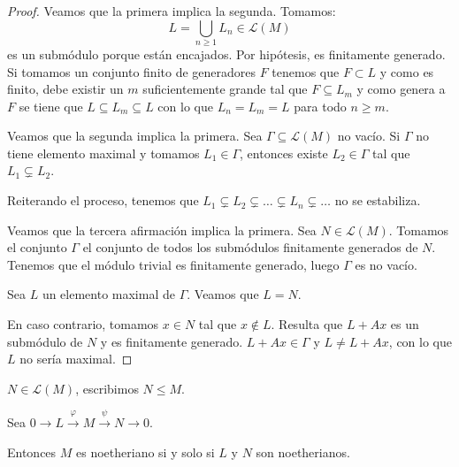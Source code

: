 \begin{proof}
  Veamos que la primera implica la segunda.
  Tomamos:
  \[
    L=\bigcup_{n\ge 1} L_n\in\mathcal{L}(M)
  \]
  es un submódulo porque están encajados. Por hipótesis, es finitamente
  generado. Si tomamos un conjunto finito de generadores \(F\)
  tenemos que \(F\subset L\) y como es finito, debe existir un \(m\)
  suficientemente grande tal que \(F\subseteq L_m\) y como
  genera a \(F\) se tiene que \(L\subseteq L_m\subseteq L\)
  con lo que \(L_n=L_m=L\) para todo \(n\ge m\).

  Veamos que la segunda implica la primera. Sea \(\Gamma\subseteq
  \mathcal{L}(M)\) no vacío. Si \(\Gamma\) no tiene elemento maximal
  y tomamos \(L_1\in\Gamma\), entonces existe \(L_2\in\Gamma\)
  tal que \(L_1\subsetneq L_2\).

  Reiterando el proceso, tenemos que \(L_1\subsetneq L_2\subsetneq
  \ldots\subsetneq L_n\subsetneq\ldots\) no se estabiliza.

  Veamos que la tercera afirmación implica la primera.
  Sea \(N\in\mathcal{L}(M)\).
  Tomamos el conjunto \(\Gamma\) el conjunto de todos los submódulos
  finitamente generados de \(N\). Tenemos que el módulo trivial
  es finitamente generado, luego \(\Gamma\) es no vacío.

  Sea \(L\) un elemento maximal de \(\Gamma\). Veamos que \(L=N\).

  En caso contrario, tomamos \(x\in N\) tal que \(x\notin L\). Resulta que
  \(L+Ax\) es un submódulo de \(N\) y es finitamente generado.
  \(L+Ax\in\Gamma\) y \(L\neq L+Ax\), con lo que \(L\) no sería maximal.
\end{proof}

\begin{nt}
  \(N\in\mathcal{L}(M)\), escribimos \(N\le M\).
\end{nt}

\begin{prop}
  Sea \(0\longrightarrow L\overset{\varphi}{\longrightarrow}
  M\overset{\psi}{\longrightarrow} N
  \longrightarrow 0\).

  Entonces \(M\) es noetheriano si y solo si \(L\) y \(N\) son
  noetherianos.
\end{prop}


